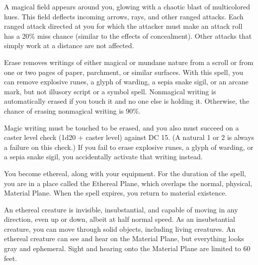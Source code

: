 \begin{multicols}{2}
\begin{small}
\noindent A magical field appears around you, glowing with a chaotic blast of multicolored hues. This field deflects incoming arrows, rays, and other ranged attacks. Each ranged attack directed at you for which the attacker must make an attack roll has a 20\% miss chance (similar to the effects of concealment). Other attacks that simply work at a distance are not affected.

\noindent Erase removes writings of either magical or mundane nature from a scroll or from one or two pages of paper, parchment, or similar surfaces. With this spell, you can remove explosive runes, a glyph of warding, a sepia snake sigil, or an arcane mark, but not illusory script or a symbol spell. Nonmagical writing is automatically erased if you touch it and no one else is holding it. Otherwise, the chance of erasing nonmagical writing is 90\%.

\smallskip\noindent Magic writing must be touched to be erased, and you also must succeed on a caster level check (1d20 + caster level) against DC 15. (A natural 1 or 2 is always a failure on this check.) If you fail to erase explosive runes, a glyph of warding, or a sepia snake sigil, you accidentally activate that writing instead.

\noindent You become ethereal, along with your equipment. For the duration of the spell, you are in a place called the Ethereal Plane, which overlaps the normal, physical, Material Plane. When the spell expires, you return to material existence.

\smallskip\noindent An ethereal creature is invisible, insubstantial, and capable of moving in any direction, even up or down, albeit at half normal speed. As an insubstantial creature, you can move through solid objects, including living creatures. An ethereal creature can see and hear on the Material Plane, but everything looks gray and ephemeral. Sight and hearing onto the Material Plane are limited to 60 feet.


\end{small}
\end{multicols}
